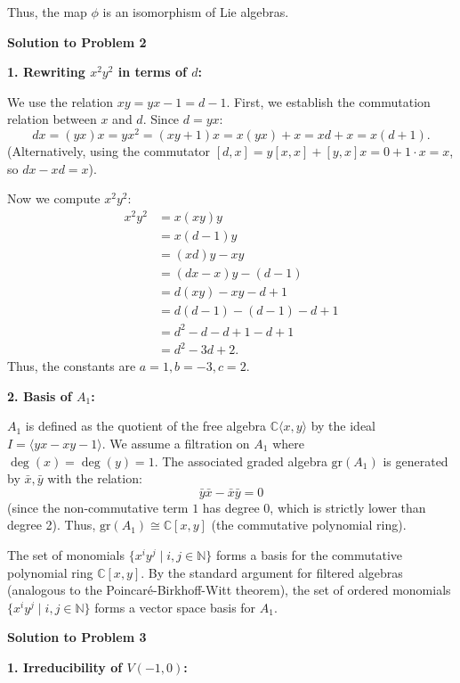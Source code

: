 \documentclass{article}
\newcommand{\C}{\mathbb{C}}
\newcommand{\N}{\mathbb{N}}
\begin{document}
Thus, the map $\phi$ is an isomorphism of Lie algebras.

\hrulefill

\textbf{Solution to Problem 2}

\textbf{1. Rewriting $x^2 y^2$ in terms of $d$:}

We use the relation $xy = yx - 1 = d - 1$. First, we establish the commutation relation between $x$ and $d$. Since $d = yx$:
\[
dx = (yx)x = yx^2 = (xy+1)x = x(yx) + x = xd + x = x(d+1).
\]
(Alternatively, using the commutator $[d, x] = y[x, x] + [y, x]x = 0 + 1 \cdot x = x$, so $dx - xd = x$).

Now we compute $x^2 y^2$:
\begin{align*}
    x^2 y^2 &= x (xy) y \\
    &= x (d-1) y \\
    &= (xd)y - xy \\
    &= (dx - x)y - (d-1) \\
    &= d(xy) - xy - d + 1 \\
    &= d(d-1) - (d-1) - d + 1 \\
    &= d^2 - d - d + 1 - d + 1 \\
    &= d^2 - 3d + 2.
\end{align*}
Thus, the constants are $a=1, b=-3, c=2$.

\vspace{0.5cm}

\textbf{2. Basis of $A_1$:}

$A_1$ is defined as the quotient of the free algebra $\C\langle x, y \rangle$ by the ideal $I = \langle yx - xy - 1 \rangle$. We assume a filtration on $A_1$ where $\deg(x) = \deg(y) = 1$. The associated graded algebra $\mathrm{gr}(A_1)$ is generated by $\bar{x}, \bar{y}$ with the relation:
\[ \bar{y}\bar{x} - \bar{x}\bar{y} = 0 \]
(since the non-commutative term $1$ has degree 0, which is strictly lower than degree 2).
Thus, $\mathrm{gr}(A_1) \cong \C[x, y]$ (the commutative polynomial ring). 

The set of monomials $\{x^i y^j \mid i, j \in \N\}$ forms a basis for the commutative polynomial ring $\C[x, y]$. By the standard argument for filtered algebras (analogous to the Poincaré-Birkhoff-Witt theorem), the set of ordered monomials $\{x^i y^j \mid i, j \in \N\}$ forms a vector space basis for $A_1$.

\hrulefill

\textbf{Solution to Problem 3}

\textbf{1. Irreducibility of $V(-1, 0)$:}
\end{document}
